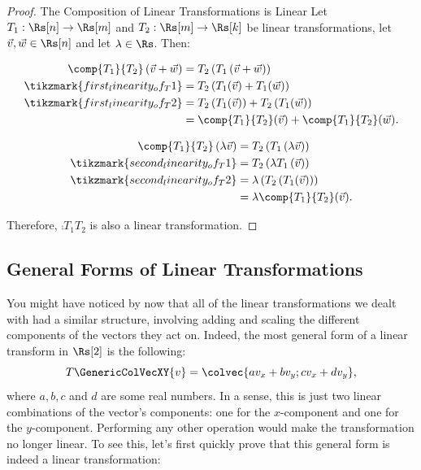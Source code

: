 \begin{proof}{The Composition of Linear Transformations is Linear}{}
	Let $T_{1}:\Rs[n]\to\Rs[m]$ and $T_{2}:\Rs[m]\to\Rs[k]$ be linear transformations, let $\vec{v},\vec{w}\in\Rs[n]$ and let $\lambda\in\Rs$. Then:
	\begin{descitemize}
	\item[Additivity]
		\begin{align*}
			\comp{T_{1}}{T_{2}}\left(\vec{v}+\vec{w}\right) &= T_{2}\left(T_{1}\left(\vec{v}+\vec{w}\right)\right)\\
			\tikzmark{first_linearity_of_T1}				&= T_{2}\left(T_{1}(\vec{v})+T_{1}(\vec{w})\right)\\
			\tikzmark{first_linearity_of_T2}				&= T_{2}\left(T_{1}(\vec{v})\right) + T_{2}\left(T_{1}(\vec{w})\right)\\
															&= \comp{T_{1}}{T_{2}}(\vec{v}) + \comp{T_{1}}{T_{2}}(\vec{w}).
		\end{align*}

		\item[Homogeneity]
			\begin{align*}
				\comp{T_{1}}{T_{2}}\left(\lambda\vec{v}\right) &= T_{2}\left(T_{1}\left(\lambda\vec{v}\right)\right)\\
				\tikzmark{second_linearity_of_T1}			   &= T_{2}\left(\lambda T_{1}\left(\vec{v}\right)\right)\\
				\tikzmark{second_linearity_of_T2}			   &= \lambda\left(T_{2}\left(T_{1}(\vec{v})\right)\right)\\
															   &= \lambda\comp{T_{1}}{T_{2}}(\vec{v}).
			\end{align*}
	\end{descitemize}

	Therefore, $\comp{T_{1}}{T_{2}}$ is also a linear transformation.
\end{proof}

\subsection{General Forms of Linear Transformations}
You might have noticed by now that all of the linear transformations we dealt with had a similar structure, involving adding and scaling the different components of the vectors they act on. Indeed, the most general form of a linear transform in $\Rs[2]$ is the following:
\begin{equation}
	T\GenericColVecXY{v} = \colvec{av_{x}+bv_{y};cv_{x}+dv_{y}},
	\label{eq:general LT in R2}
\end{equation}
where $a,b,c$ and $d$ are some real numbers. In a sense, this is just two linear combinations of the vector's components: one for the $x$-component and one for the $y$-component. Performing any other operation would make the transformation no longer linear. To see this, let's first quickly prove that this general form is indeed a linear transformation:

